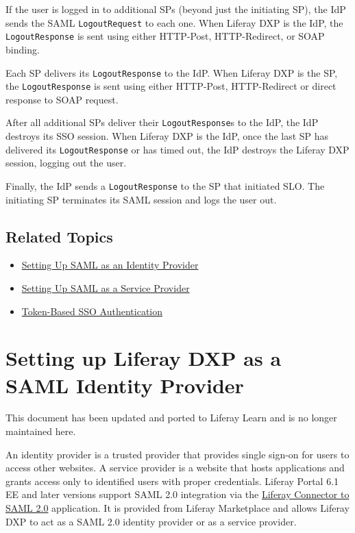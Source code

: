 If the user is logged in to additional SPs (beyond just the initiating
SP), the IdP sends the SAML \texttt{LogoutRequest} to each one. When
Liferay DXP is the IdP, the \texttt{LogoutResponse} is sent using either
HTTP-Post, HTTP-Redirect, or SOAP binding.

Each SP delivers its \texttt{LogoutResponse} to the IdP. When Liferay
DXP is the SP, the \texttt{LogoutResponse} is sent using either
HTTP-Post, HTTP-Redirect or direct response to SOAP request.

After all additional SPs deliver their \texttt{LogoutResponse}s to the
IdP, the IdP destroys its SSO session. When Liferay DXP is the IdP, once
the last SP has delivered its \texttt{LogoutResponse} or has timed out,
the IdP destroys the Liferay DXP session, logging out the user.

Finally, the IdP sends a \texttt{LogoutResponse} to the SP that
initiated SLO. The initiating SP terminates its SAML session and logs
the user out.

\section{Related Topics}\label{related-topics}

\begin{itemize}
\tightlist
\item
  \href{/docs/7-2/deploy/-/knowledge_base/d/setting-up-liferay-as-a-saml-identity-provider}{Setting
  Up SAML as an Identity Provider}
\item
  \href{/docs/7-2/deploy/-/knowledge_base/d/setting-up-liferay-as-a-saml-service-provider}{Setting
  Up SAML as a Service Provider}
\item
  \href{/docs/7-2/deploy/-/knowledge_base/d/token-based-single-sign-on-authentication}{Token-Based
  SSO Authentication}
\end{itemize}

\chapter{Setting up Liferay DXP as a SAML Identity
Provider}\label{setting-up-liferay-dxp-as-a-saml-identity-provider}

{This document has been updated and ported to Liferay Learn and is no
longer maintained here.}

An identity provider is a trusted provider that provides single sign-on
for users to access other websites. A service provider is a website that
hosts applications and grants access only to identified users with
proper credentials. Liferay Portal 6.1 EE and later versions support
SAML 2.0 integration via the
\href{https://web.liferay.com/marketplace/-/mp/application/15188711}{Liferay
Connector to SAML 2.0} application. It is provided from Liferay
Marketplace and allows Liferay DXP to act as a SAML 2.0 identity
provider or as a service provider.

